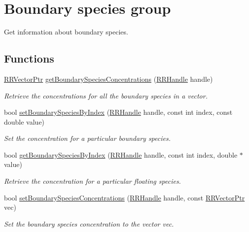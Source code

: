 \hypertarget{group__boundary}{\section{Boundary species group}
\label{group__boundary}
}


Get information about boundary species.  


\subsection*{Functions}
\begin{DoxyCompactItemize}
\item 
\hyperlink{rrc__types_8h_a3be72d6006034fd349f753d2bf441bf7}{R\+R\+Vector\+Ptr} \hyperlink{group__boundary_ga79f76cd262168c68697d915046781997}{get\+Boundary\+Species\+Concentrations} (\hyperlink{rrc__types_8h_a1d68f0592372208fa5a5f2799ea4b3ae}{R\+R\+Handle} handle)
\begin{DoxyCompactList}\small\item\em Retrieve the concentrations for all the boundary species in a vector. \end{DoxyCompactList}\item 
bool \hyperlink{group__boundary_ga456eb3f123433bba613db16c98cc7766}{set\+Boundary\+Species\+By\+Index} (\hyperlink{rrc__types_8h_a1d68f0592372208fa5a5f2799ea4b3ae}{R\+R\+Handle} handle, const int index, const double value)
\begin{DoxyCompactList}\small\item\em Set the concentration for a particular boundary species. \end{DoxyCompactList}\item 
bool \hyperlink{group__boundary_gacbc24df270121b930fe317f1f96bf478}{get\+Boundary\+Species\+By\+Index} (\hyperlink{rrc__types_8h_a1d68f0592372208fa5a5f2799ea4b3ae}{R\+R\+Handle} handle, const int index, double $\ast$value)
\begin{DoxyCompactList}\small\item\em Retrieve the concentration for a particular floating species. \end{DoxyCompactList}\item 
bool \hyperlink{group__boundary_ga2897a6feacbedd60bd05cf84dbabecfd}{set\+Boundary\+Species\+Concentrations} (\hyperlink{rrc__types_8h_a1d68f0592372208fa5a5f2799ea4b3ae}{R\+R\+Handle} handle, const \hyperlink{rrc__types_8h_a3be72d6006034fd349f753d2bf441bf7}{R\+R\+Vector\+Ptr} vec)
\begin{DoxyCompactList}\small\item\em Set the boundary species concentration to the vector vec. \end{DoxyCompactList}\item 

\end{DoxyCompactItemize}
